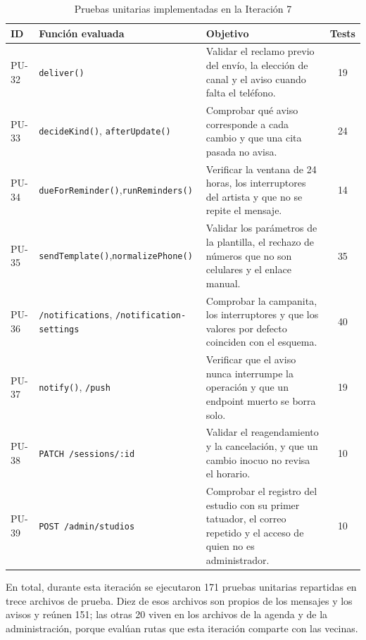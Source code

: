\documentclass[12pt,letterpaper,oneside]{report}
\begin{document}
\begin{table}[H]
  \centering
  \caption{Pruebas unitarias implementadas en la Iteración 7}
  \label{tab:pruebas7}
  \renewcommand{\arraystretch}{1.2}
  \begin{tabular}{|l|p{3.4cm}|p{6.6cm}|c|}
    \hline
    \textbf{ID} & \textbf{Función evaluada} & \textbf{Objetivo} & \textbf{Tests} \\
    \hline
    PU-32 & \texttt{deliver()} & Validar el reclamo previo del envío, la elección de canal y el aviso cuando falta el teléfono. & 19 \\ \hline
    PU-33 & \texttt{decideKind()}, \texttt{afterUpdate()} & Comprobar qué aviso corresponde a cada cambio y que una cita pasada no avisa. & 24 \\ \hline
    PU-34 & \texttt{dueFor\newline Reminder()},\newline \texttt{runReminders()} & Verificar la ventana de 24 horas, los interruptores del artista y que no se repite el mensaje. & 14 \\ \hline
    PU-35 & \texttt{sendTemplate()},\newline \texttt{normalize\newline Phone()} & Validar los parámetros de la plantilla, el rechazo de números que no son celulares y el enlace manual. & 35 \\ \hline
    PU-36 & \texttt{/notifications}, \texttt{/notification-\newline settings} & Comprobar la campanita, los interruptores y que los valores por defecto coinciden con el esquema. & 40 \\ \hline
    PU-37 & \texttt{notify()}, \texttt{/push} & Verificar que el aviso nunca interrumpe la operación y que un endpoint muerto se borra solo. & 19 \\ \hline
    PU-38 & \texttt{PATCH /sessions/:id} & Validar el reagendamiento y la cancelación, y que un cambio inocuo no revisa el horario. & 10 \\ \hline
    PU-39 & \texttt{POST /admin/\newline studios} & Comprobar el registro del estudio con su primer tatuador, el correo repetido y el acceso de quien no es administrador. & 10 \\ \hline
  \end{tabular}
\end{table}

En total, durante esta iteración se ejecutaron 171 pruebas unitarias repartidas en trece archivos de prueba. Diez de esos archivos son propios de los mensajes y los avisos y reúnen 151; las otras 20 viven en los archivos de la agenda y de la administración, porque evalúan rutas que esta iteración comparte con las vecinas.
\end{document}
